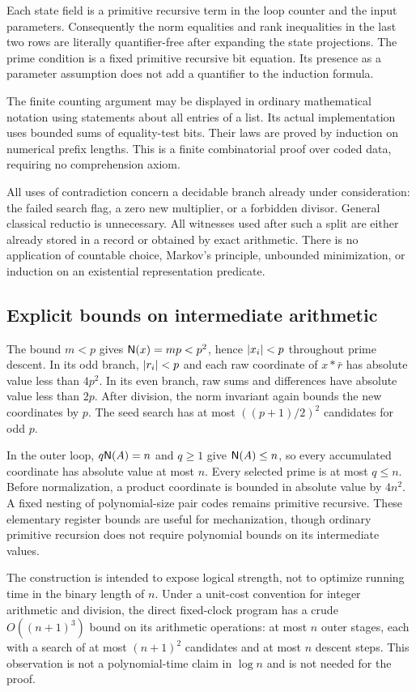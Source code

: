Each state field is a primitive recursive term in the loop counter and
the input parameters. Consequently the norm equalities and rank
inequalities in the last two rows are literally quantifier-free after
expanding the state projections. The prime condition is a fixed
primitive recursive bit equation. Its presence as a parameter assumption
does not add a quantifier to the induction formula.

The finite counting argument may be displayed in ordinary mathematical
notation using statements about all entries of a list. Its actual
implementation uses bounded sums of equality-test bits. Their laws are
proved by induction on numerical prefix lengths. This is a finite
combinatorial proof over coded data, requiring no comprehension axiom.

All uses of contradiction concern a decidable branch already under
consideration: the failed search flag, a zero new multiplier, or a
forbidden divisor. General classical reductio is unnecessary. All
witnesses used after such a split are either already stored in a record
or obtained by exact arithmetic. There is no application of countable
choice, Markov's principle, unbounded minimization, or induction on an
existential representation predicate.

\subsection{Explicit bounds on intermediate arithmetic}

The bound $m<p$ gives $\mathsf N(x)=mp<p^2$, hence $\lvert x_i\rvert<p$ throughout
prime descent. In its odd branch, $\lvert r_i\rvert<p$ and each raw coordinate
of $x*\bar r$ has absolute value less than $4p^2$. In its even branch,
raw sums and differences have absolute value less than $2p$.
After division, the norm invariant again bounds the new coordinates by
$p$. The seed search has at most $((p+1)/2)^2$ candidates for odd $p$.

In the outer loop, $q\mathsf N(A)=n$ and $q\ge1$ give
$\mathsf N(A)\le n$, so every accumulated coordinate has absolute value at
most $n$. Every selected prime is at most $q\le n$.
Before normalization, a product coordinate is bounded in absolute value
by $4n^2$. A fixed nesting of polynomial-size pair codes remains
primitive recursive. These elementary register bounds are useful for
mechanization, though ordinary primitive recursion does not require
polynomial bounds on its intermediate values.

The construction is intended to expose logical strength, not to optimize
running time in the binary length of $n$. Under a unit-cost convention for
integer arithmetic and division, the direct fixed-clock program has a
crude $O((n+1)^3)$ bound on its arithmetic operations: at most $n$ outer
stages, each with a search of at most $(n+1)^2$ candidates and at most $n$
descent steps. This observation is not a polynomial-time claim in
$\log n$ and is not needed for the proof.

